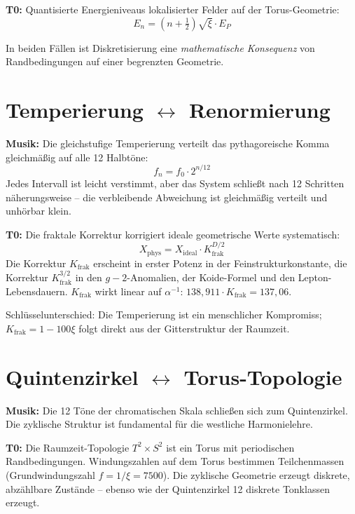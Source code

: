 \textbf{T0:} Quantisierte Energieniveaus lokalisierter Felder auf der Torus-Geometrie:
\begin{equation}
	E_n = \left(n + \tfrac{1}{2}\right) \sqrt{\xi} \cdot E_P
\end{equation}

In beiden Fällen ist Diskretisierung eine \emph{mathematische Konsequenz} von Randbedingungen auf einer begrenzten Geometrie.

\section{\texorpdfstring{Temperierung $\leftrightarrow$ Renormierung}{Temperierung -- Renormierung}}

\textbf{Musik:} Die gleichstufige Temperierung verteilt das pythagoreische Komma gleichmäßig auf alle 12 Halbtöne:
\begin{equation}
	f_n = f_0 \cdot 2^{n/12}
\end{equation}
Jedes Intervall ist leicht verstimmt, aber das System schließt nach 12 Schritten näherungsweise -- die verbleibende Abweichung ist gleichmäßig verteilt und unhörbar klein.

\textbf{T0:} Die fraktale Korrektur korrigiert ideale geometrische Werte systematisch:
\begin{equation}
	X_\text{phys} = X_\text{ideal} \cdot K_\text{frak}^{D/2}
\end{equation}
Die Korrektur $K_\text{frak}$ erscheint in erster Potenz in der Feinstrukturkonstante, die Korrektur $K_\text{frak}^{3/2}$ in den $g-2$-Anomalien, der Koide-Formel und den Lepton-Lebensdauern. $K_\text{frak}$ wirkt linear auf $\alpha^{-1}$: $138{,}911 \cdot K_\text{frak} = 137{,}06$.

Schlüsselunterschied: Die Temperierung ist ein menschlicher Kompromiss; $K_\text{frak} = 1 - 100\xi$ folgt direkt aus der Gitterstruktur der Raumzeit.

\section{\texorpdfstring{Quintenzirkel $\leftrightarrow$ Torus-Topologie}{Quintenzirkel -- Torus-Topologie}}

\textbf{Musik:} Die 12 Töne der chromatischen Skala schließen sich zum Quintenzirkel. Die zyklische Struktur ist fundamental für die westliche Harmonielehre.

\textbf{T0:} Die Raumzeit-Topologie $T^2 \times S^2$ ist ein Torus mit periodischen Randbedingungen. Windungszahlen auf dem Torus bestimmen Teilchenmassen (Grundwindungszahl $f = 1/\xi = 7500$). Die zyklische Geometrie erzeugt diskrete, abzählbare Zustände -- ebenso wie der Quintenzirkel 12 diskrete Tonklassen erzeugt.

